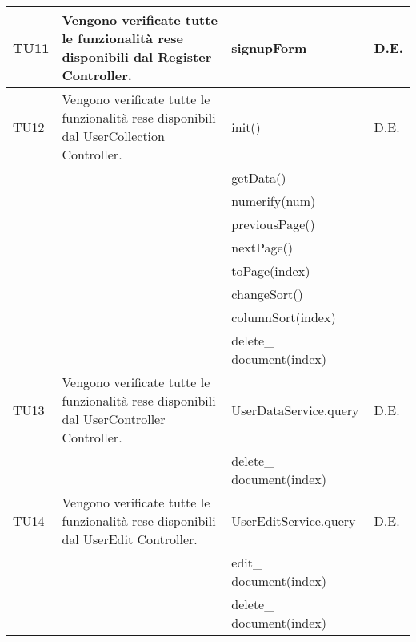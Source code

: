 \begin{center}
\begin{longtable}{|p{1cm}|p{4cm}|p{6cm}|p{2cm}|}
\midrule
TU11
& Vengono verificate tutte le funzionalità rese disponibili dal Register Controller.
& signupForm
& D.E.\\


\midrule
TU12
& Vengono verificate tutte le funzionalità rese disponibili dal UserCollection Controller.
& init()
& D.E.\\
& & getData() &\\
& & numerify(num) &\\
& & previousPage() &\\
& & nextPage() &\\
& & toPage(index) &\\
& & changeSort() &\\
& & columnSort(index) &\\
& & delete\_ document(index) &\\


\midrule
TU13
& Vengono verificate tutte le funzionalità rese disponibili dal UserController Controller.
& UserDataService.query
& D.E.\\
& & delete\_ document(index) &\\



\midrule
TU14
& Vengono verificate tutte le funzionalità rese disponibili dal UserEdit Controller.
& UserEditService.query
& D.E.\\
& & edit\_ document(index) &\\
& & delete\_ document(index) &\\





\end{longtable}
\end{center}


